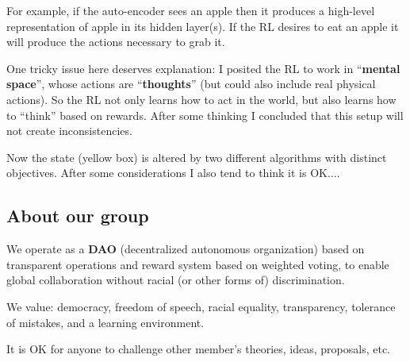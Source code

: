 \begin{preview}
\begin{minipage}{\textwidth}
For example, if the auto-encoder sees an apple then it produces a high-level representation of apple in its hidden layer(s).  If the RL desires to eat an apple it will produce the actions necessary to grab it.

One tricky issue here deserves explanation: I posited the RL to work in ``\textbf{mental space}'', whose actions are ``\textbf{thoughts}'' (but could also include real physical actions).  So the RL not only learns how to act in the world, but also learns how to ``think'' based on rewards.  After some thinking I concluded that this setup will not create inconsistencies.

Now the state (yellow box) is altered by two different algorithms with distinct objectives.  After some considerations I also tend to think it is OK....

\subsection{About our group}

We operate as a \textbf{DAO} (decentralized autonomous organization) based on transparent operations and reward system based on weighted voting, to enable global collaboration without racial (or other forms of) discrimination.

We value: democracy, freedom of speech, racial equality, transparency, tolerance of mistakes, and a learning environment.

It is OK for anyone to challenge other member's theories, ideas, proposals, etc.


\end{minipage}
\end{preview}

